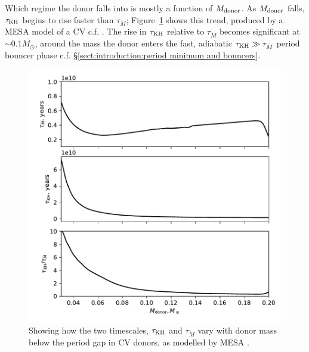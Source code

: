 Which regime the donor falls into is mostly a function of $M_{\rm donor}$. As $M_{\rm donor}$ falls, $\tau_{\rm KH}$ begins to rise faster than $\tau_{\dot M}$; Figure~\ref{fig:results:how does tauKH and tauMdot vary with donor mass} shows this trend, produced by a MESA model of a CV c.f. \citep{Paxton_2015,Pala2017a}.
The rise in $\tau_{\rm KH}$ relative to $\tau_{\dot M}$ becomes significant at $\sim 0.1 M_\odot$, around the mass the donor enters the fast, adiabatic $\tau_{\rm KH} \gg \tau_{\dot M}$ period bouncer phase c.f. \S\ref{sect:introduction:period minimum and bouncers}.
\begin{figure}
    \centering
    \includegraphics[width=\textwidth]{figures/modelling/tau_both_vs_donor_mass_AML000.pdf}
    \caption{Showing how the two timescales, $\tau_{\rm KH}$ and $\tau_{\dot M}$ vary with donor mass below the period gap in CV donors, as modelled by MESA \citep{Paxton_2015,Pala2017a}.}
    \label{fig:results:how does tauKH and tauMdot vary with donor mass}
\end{figure}


